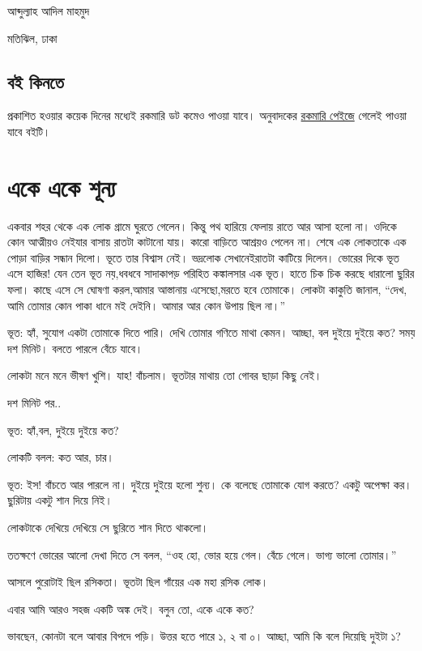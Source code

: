 \documentclass[
]{book}
\begin{document}
আব্দুল্যাহ আদিল মাহমুদ

মতিঝিল, ঢাকা

\hypertarget{ux9acux987-ux995ux9bfux9a8ux9a4ux9c7}{%
\section{বই কিনতে}\label{ux9acux987-ux995ux9bfux9a8ux9a4ux9c7}}

প্রকাশিত হওয়ার কয়েক দিনের মধ্যেই রকমারি ডট কমেও পাওয়া যাবে। অনুবাদকের \href{https://www.rokomari.com/book/author/47631}{রকমারি পেইজে} গেলেই পাওয়া যাবে বইটি।

\hypertarget{one-one-zero}{%
\chapter{একে একে শূন্য}\label{one-one-zero}}

একবার শহর থেকে এক লোক গ্রামে ঘুরতে গেলেন। কিন্তু পথ হারিয়ে ফেলায় রাতে আর আসা হলো না। ওদিকে কোন আত্মীয়ও নেইযার বাসায় রাতটা কাটানো যায়। কারো বাড়িতে আশ্রয়ও পেলেন না। শেষে এক লোকতাকে এক পোড়া বাড়ির সন্ধান দিলো। ভূতে তার বিশ্বাস নেই। ভদ্রলোক সেখানেইরাতটা কাটিয়ে দিলেন। ভোরের দিকে ভূত এসে হাজির! যেন তেন ভূত নয়,ধবধবে সাদাকাপড় পরিহিত কঙ্কালসার এক ভূত। হাতে চিক চিক করছে ধারালো ছুরির ফলা। কাছে এসে সে ঘোষণা করল,আমার আস্তানায় এসেছো,মরতে হবে তোমাকে। লোকটা কাকুতি জানাল, ``দেখ, আমি তোমার কোন পাকা ধানে মই দেইনি। আমার আর কোন উপায় ছিল না।''

ভূত: হ্যাঁ, সুযোগ একটা তোমাকে দিতে পারি। দেখি তোমার গণিতে মাথা কেমন। আচ্ছা, বল দুইয়ে দুইয়ে কত? সময় দশ মিনিট। বলতে পারলে বেঁচে যাবে।

লোকটা মনে মনে ভীষণ খুশি। যাহ! বাঁচলাম। ভূতটার মাথায় তো গোবর ছাড়া কিছু নেই।

দশ মিনিট পর..

ভূত: হ্যাঁ,বল, দুইয়ে দুইয়ে কত?

লোকটি বলল: কত আর, চার।

ভূত: ইস! বাঁচতে আর পারলে না। দুইয়ে দুইয়ে হলো শুন্য। কে বলেছে তোমাকে যোগ করতে? একটু অপেক্ষা কর। ছুরিটায় একটু শান দিয়ে নিই।

লোকটাকে দেখিয়ে দেখিয়ে সে ছুরিতে শান দিতে থাকলো।

ততক্ষণে ভোরের আলো দেখা দিতে সে বলল, ``ওহ হো, ভোর হয়ে গেল। বেঁচে গেলে। ভাগ্য ভালো তোমার।''

আসলে পুরোটাই ছিল রসিকতা। ভূতটা ছিল গাঁয়ের এক মহা রসিক লোক।

এবার আমি আরও সহজ একটি অঙ্ক দেই। বলুন তো, একে একে কত?

ভাবছেন, কোনটা বলে আবার বিপদে পড়ি। উত্তর হতে পারে ১, ২ বা ০। আচ্ছা, আমি কি বলে দিয়েছি দুইটা ১?
\end{document}
